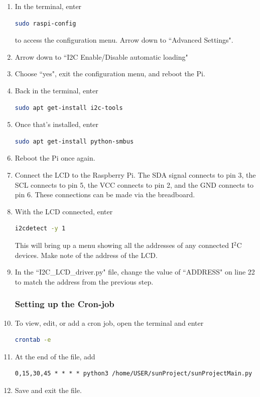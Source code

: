 \documentclass[titlepage]{article}
\begin{document}
\begin{enumerate}
\subsubsection*{Setting up the LCD}
    The contents of this section are taken from \cite{lcd_driver_location}
    \item In the terminal, enter
    \begin{lstlisting}[language=bash] 
sudo raspi-config    \end{lstlisting} 
    to access the configuration menu. Arrow down to ``Advanced Settings".
    \item Arrow down to ``I2C Enable/Disable automatic loading"
    \item Choose ``yes", exit the configuration menu, and reboot the Pi.
    \item Back in the terminal, enter
    \begin{lstlisting}[language=bash] 
sudo apt get-install i2c-tools    \end{lstlisting}
    \item Once that's installed, enter
    \begin{lstlisting}[language=bash] 
sudo apt get-install python-smbus    \end{lstlisting}
    \item Reboot the Pi once again.
    \item Connect the LCD to the Raspberry Pi. The SDA signal connects to pin 3, the SCL connects to pin 5, the VCC connects to pin 2, and the GND connects to pin 6. These connections can be made via the breadboard.
    \item With the LCD connected, enter
    \begin{lstlisting}[language=bash] 
i2cdetect -y 1     \end{lstlisting}
    This will bring up a menu showing all the addresses of any connected I$^2$C devices. Make note of the address of the LCD.
    \item In the ``I2C\_LCD\_driver.py" file, change the value of ``ADDRESS" on line 22 to match the address from the previous step. 
\subsubsection*{Setting up the Cron-job}
    \item To view, edit, or add a cron job, open the terminal and enter
    \begin{lstlisting}[language=bash]
crontab -e    \end{lstlisting}
    \item At the end of the file, add
    \begin{lstlisting}
0,15,30,45 * * * * python3 /home/USER/sunProject/sunProjectMain.py \end{lstlisting}
    \item Save and exit the file.

\end{enumerate}
\end{document}
